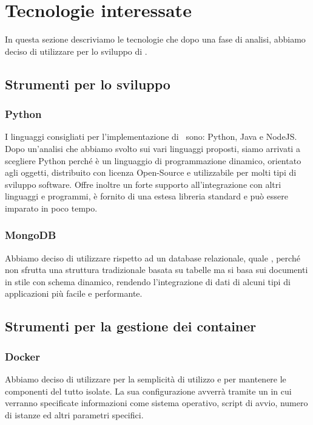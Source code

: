 \section{Tecnologie interessate}\label{Tecnologie}
In questa sezione descriviamo le tecnologie che dopo una fase di analisi, abbiamo deciso di utilizzare per lo sviluppo di \progetto.

\subsection{Strumenti per lo sviluppo}

\subsubsection{Python}
I linguaggi consigliati per l'implementazione di \progetto\ sono: Python, Java e NodeJS. Dopo un'analisi che abbiamo svolto sui vari linguaggi proposti, siamo
arrivati a scegliere Python perché è un linguaggio di programmazione dinamico, orientato agli oggetti, distribuito con licenza Open-Source e utilizzabile
per molti tipi di sviluppo software. Offre inoltre un forte supporto all'integrazione con altri linguaggi e programmi, è fornito di una estesa libreria standard e
può essere imparato in poco tempo.


\subsubsection{MongoDB}
Abbiamo deciso di utilizzare  rispetto ad un database relazionale, quale , perché non sfrutta una struttura tradizionale basata su
tabelle ma si basa sui documenti in stile  con schema dinamico, rendendo l’integrazione di dati di alcuni tipi di applicazioni più facile e performante.

\subsection{Strumenti per la gestione dei container}

\subsubsection{Docker}
Abbiamo deciso di utilizzare  per la semplicità di utilizzo e per mantenere le componenti del tutto isolate.
La sua configurazione avverrà tramite un  in cui verranno specificate informazioni come sistema operativo, script di avvio,
numero di istanze ed altri parametri specifici.

